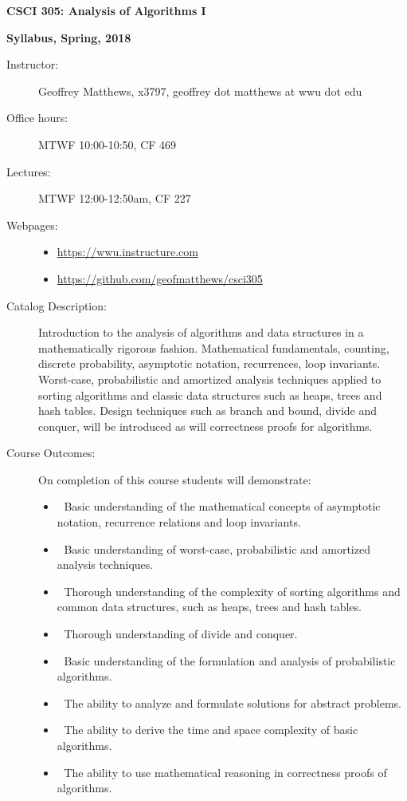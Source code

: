 \documentclass{article}
\begin{document}
\centerline{\Large \bf CSCI 305: Analysis of Algorithms I}

\centerline{\bf Syllabus,  Spring, 2018}

\begin{description}

\item[Instructor:] Geoffrey Matthews, x3797,
 geoffrey dot matthews at wwu dot edu

\item[Office hours:] MTWF 10:00-10:50, CF 469

\item[Lectures:] MTWF 12:00-12:50am, CF 227

\item [Webpages:] \mbox{}\begin{itemize}
\item\url{https://wwu.instructure.com} 
\item\url{https://github.com/geofmatthews/csci305}
\end{itemize}

\item
[Catalog Description:] Introduction to the analysis of algorithms and
data structures in a mathematically rigorous fashion. Mathematical
fundamentals, counting, discrete probability, asymptotic notation,
recurrences, loop invariants. Worst-case, probabilistic and amortized
analysis techniques applied to sorting algorithms and classic data
structures such as heaps, trees and hash tables. Design techniques
such as branch and bound, divide and conquer, will be introduced as
will correctness proofs for algorithms.

\item[Course Outcomes:] On completion of this course students will
  demonstrate:
  \begin{itemize}
\item
Basic understanding of the mathematical concepts of asymptotic
notation, recurrence relations 
and loop invariants.
\item
 Basic understanding of worst-case, probabilistic and amortized
analysis techniques.
\item
 Thorough understanding of the complexity of sorting algorithms and
common data structures, 
such as heaps, trees and hash tables.
\item
   Thorough understanding of divide and conquer.
  \item
 Basic understanding of the formulation and analysis of probabilistic
algorithms.
\item
 The ability to analyze and formulate solutions for abstract
problems.
\item
 The ability to derive the time and space complexity of basic
algorithms.
\item
 The ability to use mathematical reasoning in correctness proofs of
algorithms.
  \end{itemize}
  


\end{description}
\end{document}
